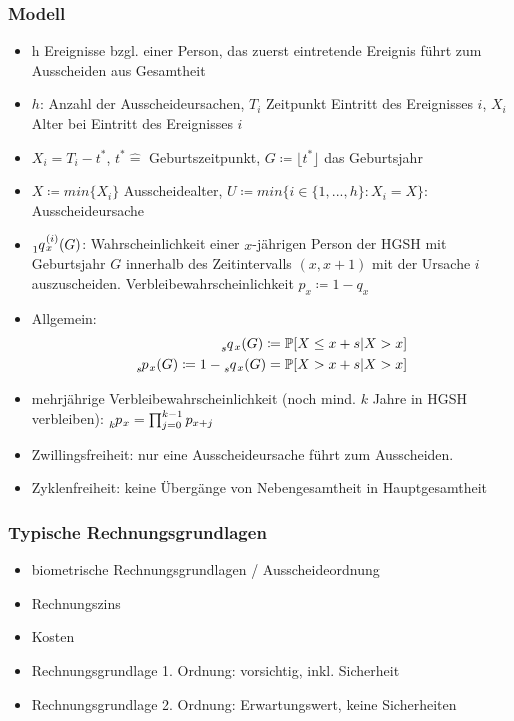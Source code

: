 \documentclass[12pt]{report}
\theoremstyle{dotless}
\theoremstyle{definition}
\begin{document}
\subsubsection{Modell}
\begin{itemize}
	\item h Ereignisse bzgl. einer Person, das zuerst eintretende Ereignis führt zum Ausscheiden aus Gesamtheit
	\item $h$: Anzahl der Ausscheideursachen, $T_i$ Zeitpunkt Eintritt des Ereignisses $i$, $X_i$ Alter bei Eintritt des Ereignisses $i$
	\item $X_i = T_i-t^*$, $t^* \hat{=}$ Geburtszeitpunkt, $G \coloneqq \lfloor t^* \rfloor$ das Geburtsjahr
	\item $X\coloneqq min\{X_i\}$ Ausscheidealter, $U\coloneqq min\{i \in \{1,...,h\}:X_i=X\}$: Ausscheideursache
	\item $\tensor[_{1}]{q}{}_x^{(i)}(G)$: Wahrscheinlichkeit einer $x$-jährigen Person der HGSH mit Geburtsjahr $G$ innerhalb des Zeitintervalls $(x,x+1)$ mit der Ursache $i$ auszuscheiden. Verbleibewahrscheinlichkeit $p_x \coloneqq 1-q_x$
	\item Allgemein: 
	\begin{align}
		\tensor[_{s}]{q}{}_x(G)\coloneqq \mathbb{P}[X \leq x+s | X>x] \\
		\tensor[_{s}]{p}{}_x(G) \coloneqq 1-\tensor[_{s}]{q}{}_x(G) = \mathbb{P}[X>x+s|X>x]
	\end{align}
	\item mehrjährige Verbleibewahrscheinlichkeit (noch mind. $k$ Jahre in HGSH verbleiben): $\tensor[_{k}]{p}{}_x = \prod_{j=0}^{k-1}p_{x+j}$
	\item Zwillingsfreiheit: nur eine Ausscheideursache führt zum Ausscheiden.
	\item Zyklenfreiheit: keine Übergänge von Nebengesamtheit in Hauptgesamtheit
\end{itemize}

\subsubsection{Typische Rechnungsgrundlagen}
\begin{itemize}
	\item biometrische Rechnungsgrundlagen / Ausscheideordnung
	\item Rechnungszins
	\item Kosten
	\item Rechnungsgrundlage 1. Ordnung: vorsichtig, inkl. Sicherheit
	\item Rechnungsgrundlage 2. Ordnung: Erwartungswert, keine Sicherheiten
\end{itemize}
\end{document}

